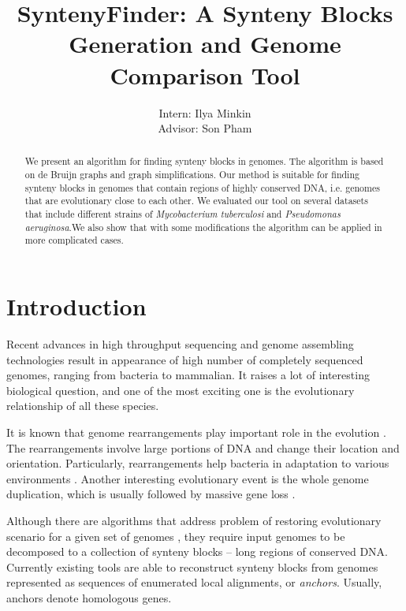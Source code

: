 \documentclass[a4paper, 12pt]{scrartcl}
\begin{document}
\title{SyntenyFinder: A Synteny Blocks Generation and Genome Comparison Tool}
\author{Intern: Ilya Minkin\\
	Advisor: Son Pham}
\date{}
\maketitle
{}

\onehalfspacing

\begin{abstract}
We present an algorithm for finding synteny blocks in genomes. The algorithm is based on de Bruijn graphs and graph simplifications.
Our method is suitable for finding synteny blocks in genomes that contain regions of highly conserved DNA, i.e. genomes that are evolutionary
close to each other. We evaluated our tool on several datasets that include different strains of \textit{Mycobacterium tuberculosi} and 
\textit{Pseudomonas aeruginosa}.We also show that with some modifications the algorithm can be applied in more complicated cases. 
\end{abstract}

\section{Introduction}

Recent advances in high throughput sequencing and genome assembling technologies result in appearance of high number of
completely sequenced genomes, ranging from bacteria to mammalian. It raises a lot of interesting biological question, and one of the most
exciting one is the evolutionary relationship of all these species. 

It is known that genome rearrangements play important role in the evolution \cite{Pevzner2003a, Pevzner2003b, Bourque2004, Sankof2003}. The
rearrangements involve large portions of DNA and change their location and orientation. Particularly, rearrangements help bacteria in adaptation to various
environments \cite{Aujolat2012}. Another interesting evolutionary event is the whole genome duplication, which is usually
followed by massive gene loss \cite{Arabidopsis2000, Kellis2004}.

Although there are algorithms that address problem of restoring evolutionary scenario for a given set of genomes \cite{Alekseyev2009}, they require input
genomes to be  decomposed to a collection of synteny blocks -- long regions of conserved DNA. Currently existing tools
\cite{Pham2010} are able to reconstruct synteny blocks from genomes represented as sequences of enumerated local alignments, or \textit{anchors}.
Usually, anchors denote homologous genes.
\end{document}
